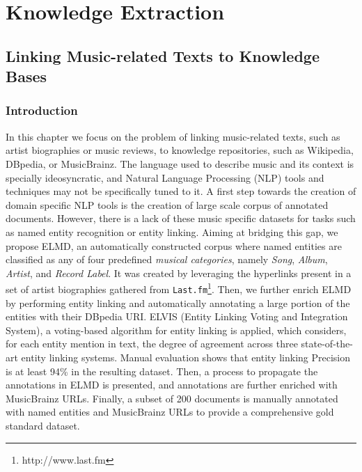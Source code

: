 \part{Knowledge Extraction}
\label{part:knowledge-extraction}

\chapter[Linking Music-related Texts to Knowledge Bases][Linking Music-related Texts to KBs]{Linking Music-related Texts to Knowledge Bases}
\label{sec:linking}


\section{Introduction}
\label{sec:linking:intro}

In this chapter we focus on the problem of linking music-related texts, such as artist biographies or music reviews, to knowledge repositories, such as Wikipedia, DBpedia, or MusicBrainz. 
The language used to describe music and its context is specially ideosyncratic, and Natural Language Processing (NLP) tools and techniques may not be specifically tuned to it. A first step towards the creation of domain specific NLP tools is the creation of large scale corpus of annotated documents.
However, there is a lack of these music specific datasets for tasks such as named entity recognition or entity linking. Aiming at bridging this gap, we propose \textsc{ELMD}, an automatically constructed corpus where named entities are classified as any of four predefined \textit{musical categories}, namely \textit{Song}, \textit{Album}, \textit{Artist}, and \textit{Record Label}. It was created by leveraging the hyperlinks present in a set of artist biographies gathered from \texttt{Last.fm}\footnote{http://www.last.fm}. Then, we further enrich \textsc{ELMD} by performing entity linking and automatically annotating a large portion of the entities with their DBpedia URI. \textsc{ELVIS} (Entity Linking Voting and Integration System), a voting-based algorithm for entity linking is applied, which considers, for each entity mention in text, the degree of agreement across three state-of-the-art entity linking systems. 
Manual evaluation shows that entity linking Precision is at least 94\% in the resulting dataset.
Then, a process to propagate the annotations in \textsc{ELMD} is presented, and annotations are further enriched with MusicBrainz URLs.
Finally, a subset of 200 documents is manually annotated with named entities and MusicBrainz URLs to provide a comprehensive gold standard dataset. 

